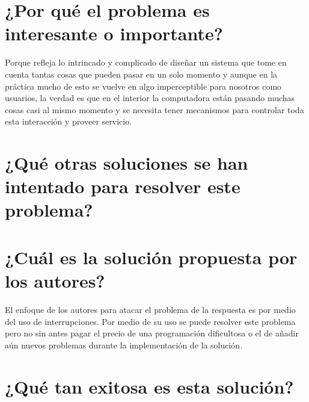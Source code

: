 \section{¿Por qué el problema es interesante o importante?}
Porque refleja lo intrincado y complicado de diseñar un sistema que tome en cuenta tantas cosas que pueden pasar en un solo momento y aunque en la práctica mucho de esto se vuelve en algo imperceptible para nosotros como usuarios, la verdad es que en el interior la computadora están pasando muchas cosas casi al mismo momento y se necesita tener mecanismos para controlar toda esta interacción y proveer servicio.


\section{¿Qué otras soluciones se han intentado para resolver este problema?}
     
\section{¿Cuál es la solución propuesta por los autores?}
El enfoque de los autores para atacar el problema de la respuesta es por medio del uso de interrupciones. Por medio de su uso se puede resolver este problema pero no sin antes pagar el precio de una programación dificultosa o el de añadir aún nuevos problemas durante la implementación de la solución.


\section{¿Qué tan exitosa es esta solución?} 
